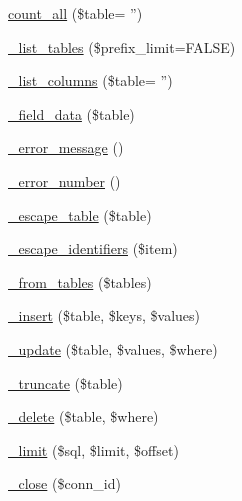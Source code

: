 \begin{DoxyCompactItemize}
\hyperlink{class_c_i___d_b__sqlsrv__driver_a66111c61856499b091af32502978d4fc}{count\-\_\-all} (\$table= '')
\item 
\hyperlink{class_c_i___d_b__sqlsrv__driver_a435c0f3ce54fe7daa178baa8532ebd54}{\-\_\-list\-\_\-tables} (\$prefix\-\_\-limit=F\-A\-L\-S\-E)
\item 
\hyperlink{class_c_i___d_b__sqlsrv__driver_a2a81bb476a5c76fe6f763b0557c1e4c2}{\-\_\-list\-\_\-columns} (\$table= '')
\item 
\hyperlink{class_c_i___d_b__sqlsrv__driver_a95247d9671893adc3444cb184ad32ea1}{\-\_\-field\-\_\-data} (\$table)
\item 
\hyperlink{class_c_i___d_b__sqlsrv__driver_a4ca764fe1d6ad526f770f36b5f332bbb}{\-\_\-error\-\_\-message} ()
\item 
\hyperlink{class_c_i___d_b__sqlsrv__driver_a3e48199b3a946499b7e5fba0cdfa6b86}{\-\_\-error\-\_\-number} ()
\item 
\hyperlink{class_c_i___d_b__sqlsrv__driver_a1a84c751611040e03fe44114e993123d}{\-\_\-escape\-\_\-table} (\$table)
\item 
\hyperlink{class_c_i___d_b__sqlsrv__driver_aeabfb3952399caa92a013621a98e3042}{\-\_\-escape\-\_\-identifiers} (\$item)
\item 
\hyperlink{class_c_i___d_b__sqlsrv__driver_a885a8b4372b5c099749cefa73767a744}{\-\_\-from\-\_\-tables} (\$tables)
\item 
\hyperlink{class_c_i___d_b__sqlsrv__driver_a69ee76b136052e0a8f06097fb388e53e}{\-\_\-insert} (\$table, \$keys, \$values)
\item 
\hyperlink{class_c_i___d_b__sqlsrv__driver_a5f9fc4b82330824686bf96ce3b3379d2}{\-\_\-update} (\$table, \$values, \$where)
\item 
\hyperlink{class_c_i___d_b__sqlsrv__driver_aa029600528fc1ce660a23ff4b4667f95}{\-\_\-truncate} (\$table)
\item 
\hyperlink{class_c_i___d_b__sqlsrv__driver_a3bb2ac37b3332df3bd509740b6c2cdd4}{\-\_\-delete} (\$table, \$where)
\item 
\hyperlink{class_c_i___d_b__sqlsrv__driver_aeeaa5cd68dc6ace010c0b8aae89c2d15}{\-\_\-limit} (\$sql, \$limit, \$offset)
\item 
\hyperlink{class_c_i___d_b__sqlsrv__driver_a557bd6ddde8de1f7814e10b1120efd29}{\-\_\-close} (\$conn\-\_\-id)
\end{DoxyCompactItemize}
